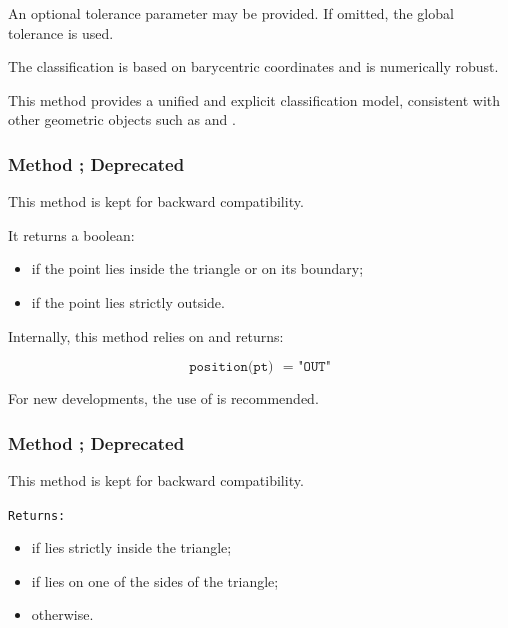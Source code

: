 \medskip

An optional tolerance parameter  may be provided.
If omitted, the global tolerance  is used.

\medskip

The classification is based on barycentric coordinates
and is numerically robust.

\medskip

This method provides a unified and explicit classification model,
consistent with other geometric objects such as
 and .



\subsubsection{Method ; Deprecated}
\label{ssub:_triangle_in__out_pt}


This method is kept for backward compatibility.

It returns a boolean:

\begin{itemize}
  \item {}  if the point lies inside the triangle
        or on its boundary;
  \item {} if the point lies strictly outside.
\end{itemize}

\medskip

Internally, this method relies on
 and returns:

\[
\texttt{position(pt) ~= "OUT"}
\]

\medskip

For new developments, the use of
 is recommended.


\subsubsection{Method ; Deprecated}
\label{ssub:method_triangle_on_triangle}

This method is kept for backward compatibility.


\medskip

\texttt{Returns: }
\begin{itemize}
  \item {} if  lies strictly inside the triangle;
  \item {} if  lies on one of the sides of the triangle;
  \item {} otherwise.
\end{itemize}




